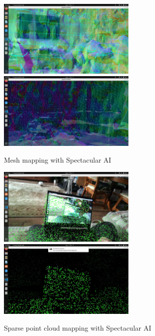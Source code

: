 \begin{figure}[htbp]
	\centering
	\includegraphics[width=67mm, keepaspectratio]{figures_jpg/spectacular_ai_mapping_ar_mesh1.jpg}\hspace{1cm}
	\includegraphics[width=67mm, keepaspectratio]{figures_jpg/spectacular_ai_mapping_ar_mesh2.jpg}\\\vspace{5mm}
	\caption{Mesh mapping with Spectacular AI}
    \label{fig:SPAI_mesh_mapping}
\end{figure}

\begin{figure}[htbp]
	\centering
	\includegraphics[width=67mm, keepaspectratio]{figures_jpg/spectacular_ai_mapping_ar_pc1.jpg}\hspace{1cm}
	\includegraphics[width=67mm, keepaspectratio]{figures_jpg/spectacular_ai_mapping_ar_pc2.jpg}\\\vspace{5mm}
	\caption{Sparse point cloud mapping with Spectacular AI}
    \label{fig:SPAI_point_cloud_mapping}
\end{figure}

